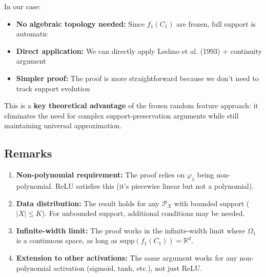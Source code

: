 In our case:
\begin{itemize}
\item \textbf{No algebraic topology needed:} Since $f_1(C_1)$ are frozen, full support is automatic
\item \textbf{Direct application:} We can directly apply Leshno et al. (1993) + continuity argument
\item \textbf{Simpler proof:} The proof is more straightforward because we don't need to track support evolution
\end{itemize}

This is a \textbf{key theoretical advantage} of the frozen random feature approach: it eliminates the need for complex support-preservation arguments while still maintaining universal approximation.

\subsection{Remarks}

\begin{enumerate}
\item \textbf{Non-polynomial requirement:} The proof relies on $\varphi_1$ being non-polynomial. ReLU satisfies this (it's piecewise linear but not a polynomial).

\item \textbf{Data distribution:} The result holds for any $\mathcal{P}_X$ with bounded support ($|X| \le K$). For unbounded support, additional conditions may be needed.

\item \textbf{Infinite-width limit:} The proof works in the infinite-width limit where $\Omega_1$ is a continuous space, as long as $\text{supp}(f_1(C_1)) = \mathbb{R}^d$.

\item \textbf{Extension to other activations:} The same argument works for any non-polynomial activation (sigmoid, tanh, etc.), not just ReLU.
\end{enumerate}
